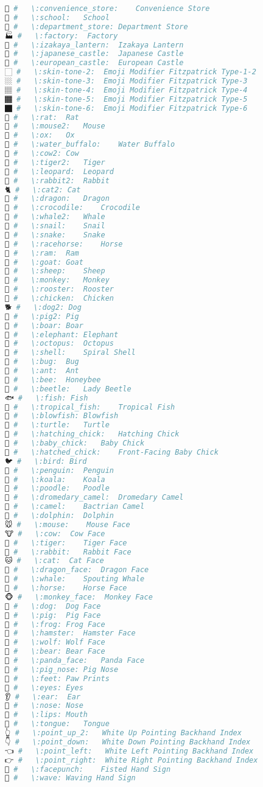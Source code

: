 \begin{lstlisting}[language=Julia]
🏪 #   \:convenience_store:    Convenience Store
🏫 #   \:school:   School
🏬 #   \:department_store: Department Store
🏭 #   \:factory:  Factory
🏮 #   \:izakaya_lantern:  Izakaya Lantern
🏯 #   \:japanese_castle:  Japanese Castle
🏰 #   \:european_castle:  European Castle
🏻 #   \:skin-tone-2:  Emoji Modifier Fitzpatrick Type-1-2
🏼 #   \:skin-tone-3:  Emoji Modifier Fitzpatrick Type-3
🏽 #   \:skin-tone-4:  Emoji Modifier Fitzpatrick Type-4
🏾 #   \:skin-tone-5:  Emoji Modifier Fitzpatrick Type-5
🏿 #   \:skin-tone-6:  Emoji Modifier Fitzpatrick Type-6
🐀 #   \:rat:  Rat
🐁 #   \:mouse2:   Mouse
🐂 #   \:ox:   Ox
🐃 #   \:water_buffalo:    Water Buffalo
🐄 #   \:cow2: Cow
🐅 #   \:tiger2:   Tiger
🐆 #   \:leopard:  Leopard
🐇 #   \:rabbit2:  Rabbit
🐈 #   \:cat2: Cat
🐉 #   \:dragon:   Dragon
🐊 #   \:crocodile:    Crocodile
🐋 #   \:whale2:   Whale
🐌 #   \:snail:    Snail
🐍 #   \:snake:    Snake
🐎 #   \:racehorse:    Horse
🐏 #   \:ram:  Ram
🐐 #   \:goat: Goat
🐑 #   \:sheep:    Sheep
🐒 #   \:monkey:   Monkey
🐓 #   \:rooster:  Rooster
🐔 #   \:chicken:  Chicken
🐕 #   \:dog2: Dog
🐖 #   \:pig2: Pig
🐗 #   \:boar: Boar
🐘 #   \:elephant: Elephant
🐙 #   \:octopus:  Octopus
🐚 #   \:shell:    Spiral Shell
🐛 #   \:bug:  Bug
🐜 #   \:ant:  Ant
🐝 #   \:bee:  Honeybee
🐞 #   \:beetle:   Lady Beetle
🐟 #   \:fish: Fish
🐠 #   \:tropical_fish:    Tropical Fish
🐡 #   \:blowfish: Blowfish
🐢 #   \:turtle:   Turtle
🐣 #   \:hatching_chick:   Hatching Chick
🐤 #   \:baby_chick:   Baby Chick
🐥 #   \:hatched_chick:    Front-Facing Baby Chick
🐦 #   \:bird: Bird
🐧 #   \:penguin:  Penguin
🐨 #   \:koala:    Koala
🐩 #   \:poodle:   Poodle
🐪 #   \:dromedary_camel:  Dromedary Camel
🐫 #   \:camel:    Bactrian Camel
🐬 #   \:dolphin:  Dolphin
🐭 #   \:mouse:    Mouse Face
🐮 #   \:cow:  Cow Face
🐯 #   \:tiger:    Tiger Face
🐰 #   \:rabbit:   Rabbit Face
🐱 #   \:cat:  Cat Face
🐲 #   \:dragon_face:  Dragon Face
🐳 #   \:whale:    Spouting Whale
🐴 #   \:horse:    Horse Face
🐵 #   \:monkey_face:  Monkey Face
🐶 #   \:dog:  Dog Face
🐷 #   \:pig:  Pig Face
🐸 #   \:frog: Frog Face
🐹 #   \:hamster:  Hamster Face
🐺 #   \:wolf: Wolf Face
🐻 #   \:bear: Bear Face
🐼 #   \:panda_face:   Panda Face
🐽 #   \:pig_nose: Pig Nose
🐾 #   \:feet: Paw Prints
👀 #   \:eyes: Eyes
👂 #   \:ear:  Ear
👃 #   \:nose: Nose
👄 #   \:lips: Mouth
👅 #   \:tongue:   Tongue
👆 #   \:point_up_2:   White Up Pointing Backhand Index
👇 #   \:point_down:   White Down Pointing Backhand Index
👈 #   \:point_left:   White Left Pointing Backhand Index
👉 #   \:point_right:  White Right Pointing Backhand Index
👊 #   \:facepunch:    Fisted Hand Sign
👋 #   \:wave: Waving Hand Sign

\end{lstlisting}
